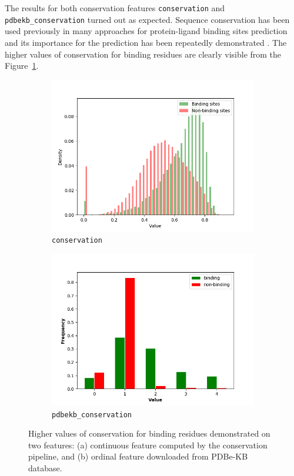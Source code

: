The results for both conservation features \texttt{conservation} and \texttt{pdbekb\_conservation} turned out as expected. Sequence conservation has been used previously in many approaches for protein-ligand binding sites prediction and its importance for the prediction has been repeatedly demonstrated \cite{ligsite, cons, casp, prankweb}. The higher values of conservation for binding residues are clearly visible from the Figure~\ref{fig:conservation}.

\begin{figure}[!htbp]
\centering
\begin{subfigure}{.5\textwidth}
  \centering
  \includegraphics[width=1\linewidth]{../img/conservation_hist.png}
  \caption{\texttt{conservation}}
\end{subfigure}%
\begin{subfigure}{.5\textwidth}
  \centering
  \includegraphics[width=1\linewidth]{../img/pdbekb_conservation_frequencies.png}
  \caption{\texttt{pdbekb\_conservation}}
\end{subfigure}
\caption{Higher values of conservation for binding residues demonstrated on two features: (a) continuous feature computed by the conservation pipeline, and (b) ordinal feature downloaded from PDBe-KB database.}
\label{fig:conservation}
\end{figure}

